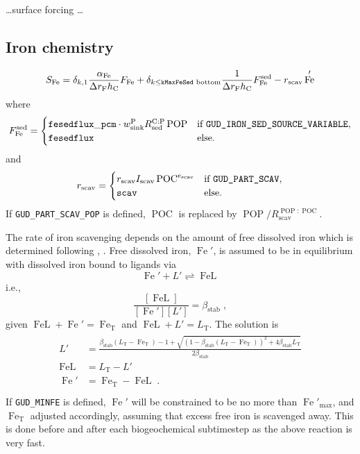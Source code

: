 \documentclass[11pt,letterpaper,english]{article}
\newcommand{\lxr}[1]{{\tt #1}}
\DeclareMathOperator{\Fe}{Fe}
\DeclareMathOperator{\FeL}{FeL}
\DeclareMathOperator{\POP}{POP}
\DeclareMathOperator{\POC}{POC}
\newcommand{\F}{\mathrm{F}}
\newcommand{\C}{\mathrm{C}}
\renewcommand{\P}{\mathrm{P}}
\newcommand{\total}{{\mathrm{T}}}
\newcommand{\FeT}{\Fe_\total}
\newcommand{\Ltot}{L_\total}
\newcommand{\sed}{{\text{sed}}}
\newcommand{\stab}{\text{stab}}
\newcommand{\Lstab}{\beta_{\stab}}
\newcommand{\scav}{{\text{scav}}}
\newcommand{\sink}{{\text{sink}}}
\begin{document}
\dots surface forcing \dots



\subsection{Iron chemistry}

\[
  S_{\Fe} = \delta_{k,1} \frac{\alpha_{\Fe}}{\Delta r_\F h_\C} F_{\Fe}
          + \delta_{k\le{\tt kMaxFeSed}\text{ bottom}}
            \frac{1}{\Delta r_\F h_\C} F_{\Fe}^\sed
          - r_\scav \Fe'
\]
where
\[
  F_{\Fe}^\sed = \begin{cases}
    {\tt fesedflux\_pcm}\cdot w^\P_\sink R^{\C:\P}_\sed \POP
    & \text{if \tt GUD\_IRON\_SED\_SOURCE\_VARIABLE}, \\
    {\tt fesedflux}
    & \text{else.}
    \end{cases}
\]
and
\[
  r_\scav = \begin{cases}
    r_\scav I_\scav \POC^{e_\scav}
    & \text{if \tt GUD\_PART\_SCAV}, \\
    {\tt scav}
    & \text{else.}
    \end{cases}
\]
If \verb|GUD_PART_SCAV_POP| is defined, $\POC$ is replaced by
$\POP\!/R^{\POP:\POC}_\scav$.


The rate of iron scavenging depends on the amount of free dissolved iron which
is determined following \cite{Parekh2004}, \cite{Dutkiewicz2005}.
Free dissolved iron, $\Fe'$, is assumed to be in equilibrium with dissolved iron
bound to ligands via
\[
  \Fe' + L' \rightleftharpoons \FeL
\]
i.e.,
\[
  \frac{[\FeL]}{[\Fe'][L']} = \Lstab
  \;,
\]
given $\FeL+\Fe'=\FeT$ and $\FeL+L'=\Ltot$.  The solution is
\begin{align*}
 \begin{split}
  L' &= \frac{ \Lstab (\Ltot - \FeT) - 1
             +\sqrt{(1 - \Lstab (\Ltot - \FeT))^2 + 4 \Lstab \Ltot}}
          {2 \Lstab}
    \\
  \FeL &= \Ltot - L' \\
  \Fe' &= \FeT - \FeL
  \;.
 \end{split}
  \\
\end{align*}
If \lxr{GUD\_MINFE} is defined, $\Fe'$ will be constrained to be no more than $\Fe'_{\max}$,
and $\FeT$ adjusted accordingly, assuming that excess free iron is scavenged away.
This is done before and after each biogeochemical subtimestep as the above reaction
is very fast.
\end{document}
